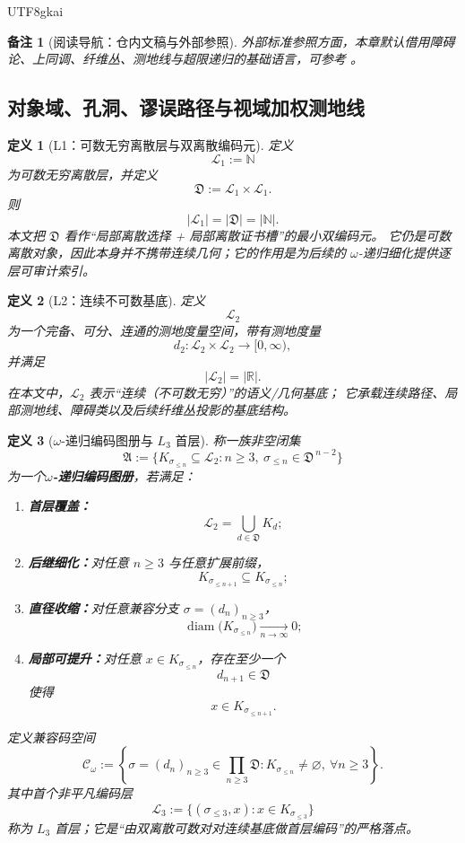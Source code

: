 \documentclass[12pt]{article}
\newtheorem{definition}{定义}[section]
\newtheorem{remark}{备注}[section]
\newcommand{\NN}{\mathbb{N}}
\newcommand{\RR}{\mathbb{R}}
\newcommand{\Lone}{\mathcal{L}_1}
\newcommand{\Ltwo}{\mathcal{L}_2}
\newcommand{\Lthree}{\mathcal{L}_3}
\newcommand{\Dpair}{\mathfrak D}
\newcommand{\CodeSpace}{\mathcal{C}_\omega}
\newcommand{\diam}{\operatorname{diam}}
\begin{document}
\begin{CJK*}{UTF8}{gkai}
\begin{remark}[阅读导航：仓内文稿与外部参照]
外部标准参照方面，本章默认借用障碍论、上同调、纤维丛、测地线与超限递归的基础语言，可参考
\cite{Hatcher2002AT,Weibel1994HomologicalAlgebra,Husemoller1994FibreBundles,KobayashiNomizu1963Foundations,
  Lee2018RiemannianManifolds,Jech2003SetTheory}。
\end{remark}

\subsection{对象域、孔洞、谬误路径与视域加权测地线}
\label{subsec:tex41-ch1-defs}

\begin{definition}[L1：可数无穷离散层与双离散编码元]
\label{def:tex41-l1}
定义
\[
  \Lone:=\NN
\]
为可数无穷离散层，并定义
\[
  \Dpair:=\Lone\times\Lone.
\]
则
\[
  |\Lone|=|\Dpair|=|\NN|.
\]
本文把 $\Dpair$ 看作“局部离散选择 + 局部离散证书槽”的最小双编码元。
它仍是可数离散对象，因此本身并不携带连续几何；它的作用是为后续的 $\omega$-递归细化提供逐层可审计索引。
\end{definition}

\begin{definition}[L2：连续不可数基底]
\label{def:tex41-l2}
定义
\[
  \Ltwo
\]
为一个完备、可分、连通的测地度量空间，带有测地度量
\[
  d_2:\Ltwo\times\Ltwo\to[0,\infty),
\]
并满足
\[
  |\Ltwo|=|\RR|.
\]
在本文中，$\Ltwo$ 表示“连续（不可数无穷）”的语义/几何基底；
它承载连续路径、局部测地线、障碍类以及后续纤维丛投影的基底结构。
\end{definition}

\begin{definition}[$\omega$-递归编码图册与 $L_3$ 首层]
\label{def:tex41-l3-atlas}
称一族非空闭集
\[
  \mathfrak A
  :=
  \bigl\{
    K_{\sigma_{\le n}}\subseteq \Ltwo:
    n\ge 3,\
    \sigma_{\le n}\in\Dpair^{\,n-2}
  \bigr\}
\]
为一个\textbf{$\omega$-递归编码图册}，若满足：
\begin{enumerate}
  \item \textbf{首层覆盖：}
  \[
    \Ltwo=\bigcup_{d\in\Dpair}K_d;
  \]
  \item \textbf{后继细化：}对任意 $n\ge 3$ 与任意扩展前缀，
  \[
    K_{\sigma_{\le n+1}}\subseteq K_{\sigma_{\le n}};
  \]
  \item \textbf{直径收缩：}对任意兼容分支 $\sigma=(d_n)_{n\ge 3}$，
  \[
    \diam\!\bigl(K_{\sigma_{\le n}}\bigr)\xrightarrow[n\to\infty]{}0;
  \]
  \item \textbf{局部可提升：}对任意 $x\in K_{\sigma_{\le n}}$，存在至少一个
  \[
    d_{n+1}\in\Dpair
  \]
  使得
  \[
    x\in K_{\sigma_{\le n+1}}.
  \]
\end{enumerate}
定义兼容码空间
\[
  \CodeSpace
  :=
  \left\{
    \sigma=(d_n)_{n\ge 3}\in\prod_{n\ge 3}\Dpair:
    K_{\sigma_{\le n}}\neq\varnothing,\ \forall n\ge 3
  \right\}.
\]
其中首个非平凡编码层
\[
  \Lthree:=\{(\sigma_{\le 3},x):x\in K_{\sigma_{\le 3}}\}
\]
称为 $L_3$ 首层；它是“由双离散可数对对连续基底做首层编码”的严格落点。
\end{definition}


\end{CJK*}
\end{document}
